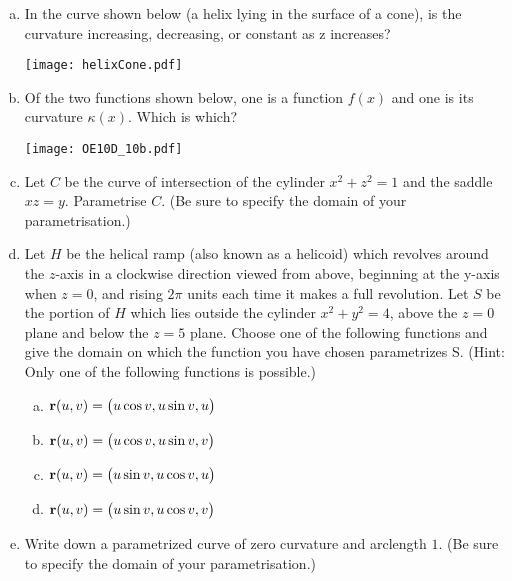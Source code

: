 \goodbreak
\begin{question}[M317 2010D] %

\begin{enumerate}[(a)]
\item
In the curve shown below (a helix lying in the surface of a cone), is the
curvature increasing, decreasing, or constant as z increases?

\begin{center}
       \texttt{[image: helixCone.pdf]}
\end{center}


\item
Of the two functions shown below, one is a function $f(x)$ and one is its
curvature $\kappa(x)$. Which is which?

\begin{center}
       \texttt{[image: OE10D\_10b.pdf]}
\end{center}



\item
Let $C$ be the curve of intersection of the cylinder $x^2 + z^2 = 1$ 
and the saddle $xz = y$. Parametrise $C$. (Be sure to specify the domain of
your parametrisation.)

\item 
Let $H$ be the helical ramp (also known as a helicoid) which revolves around
the $z$-axis in a clockwise direction viewed from above, beginning 
at the y-axis when $z = 0$, and rising $2\pi$ units each time it makes 
a full revolution. Let $S$ be the portion
of $H$ which lies outside the cylinder $x^2 + y^2 = 4$, above the 
$z = 0$ plane and below the $z = 5$ plane.
Choose one of the following functions and give the domain on which the 
function you have chosen parametrizes S. (Hint: Only one of the following functions is possible.)
\begin{enumerate}[(a)]
\item 
$\mathbf{r}(u, v) = \big(u \cos v, u \sin v, u\big)$
\item 
$\mathbf{r}(u, v) = \big(u \cos v, u \sin v, v\big)$
\item 
$\mathbf{r}(u, v) = \big(u \sin v, u \cos v, u\big)$
\item 
$\mathbf{r}(u, v) = \big(u \sin v, u \cos v, v\big)$
\end{enumerate}

\item 
Write down a parametrized curve of zero curvature and arclength $1$.
(Be sure to specify the domain of your parametrisation.)


\end{enumerate}
\end{question}
